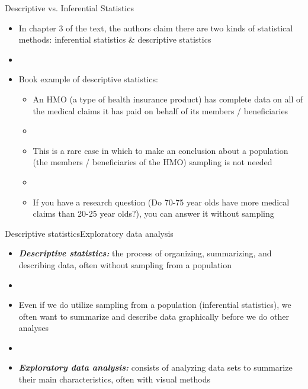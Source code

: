 \documentclass[xcolor=dvipsnames]{beamer}
\begin{document}
\begin{frame}{Descriptive vs. Inferential Statistics}
\begin{itemize}
	\item In chapter 3 of the text, the authors claim there are two kinds of statistical methods: inferential statistics \& descriptive statistics
	\item[]
	\item Book example of descriptive statistics: 
	\begin{itemize}
		\item An HMO (a type of health insurance product) has complete data on all of the medical claims it has paid on behalf of its members / beneficiaries
		\item[]
		\item This is a rare case in which to make an conclusion about a population (the members / beneficiaries of the HMO) sampling is not needed
		\item[] 
		\item If you have a research question (Do 70-75 year olds have more medical claims than 20-25 year olds?), you can answer it without sampling
	\end{itemize}
\end{itemize}
\end{frame}

\begin{frame}{Descriptive statistics}{Exploratory data analysis}
	\begin{itemize}
		\item \textbf{\emph{Descriptive statistics:}} the process of organizing, summarizing, and describing data, often without sampling from a population
		\item[]
		\item Even if we do utilize sampling from a population (inferential statistics), we often want to summarize and describe data graphically before we do other analyses
		\item[]
		\item \textbf{\emph{Exploratory data analysis:}} consists of analyzing data sets to summarize their main characteristics, often with visual methods
	\end{itemize}
\end{frame}
\end{document}
